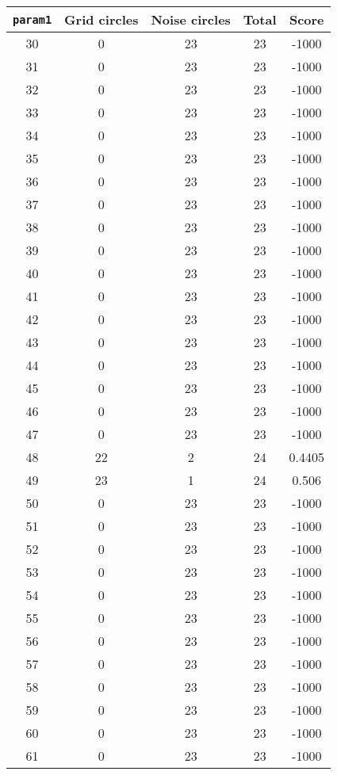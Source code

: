 \documentclass[letterpaper, 12pt]{article}
\begin{document}
\begin{longtable}{|c|c|c|c|c|}
\hline
\textbf{\texttt{param1}} & \textbf{Grid circles} & \textbf{Noise circles} & \textbf{Total} & \textbf{Score} \\
\hline
30 & 0 & 23 & 23 & -1000 \\
\hline
31 & 0 & 23 & 23 & -1000 \\
\hline
32 & 0 & 23 & 23 & -1000 \\
\hline
33 & 0 & 23 & 23 & -1000 \\
\hline
34 & 0 & 23 & 23 & -1000 \\
\hline
35 & 0 & 23 & 23 & -1000 \\
\hline
36 & 0 & 23 & 23 & -1000 \\
\hline
37 & 0 & 23 & 23 & -1000 \\
\hline
38 & 0 & 23 & 23 & -1000 \\
\hline
39 & 0 & 23 & 23 & -1000 \\
\hline
40 & 0 & 23 & 23 & -1000 \\
\hline
41 & 0 & 23 & 23 & -1000 \\
\hline
42 & 0 & 23 & 23 & -1000 \\
\hline
43 & 0 & 23 & 23 & -1000 \\
\hline
44 & 0 & 23 & 23 & -1000 \\
\hline
45 & 0 & 23 & 23 & -1000 \\
\hline
46 & 0 & 23 & 23 & -1000 \\
\hline
47 & 0 & 23 & 23 & -1000 \\
\hline
48 & 22 & 2 & 24 & 0.4405 \\
\hline
49 & 23 & 1 & 24 & 0.506 \\
\hline
50 & 0 & 23 & 23 & -1000 \\
\hline
51 & 0 & 23 & 23 & -1000 \\
\hline
52 & 0 & 23 & 23 & -1000 \\
\hline
53 & 0 & 23 & 23 & -1000 \\
\hline
54 & 0 & 23 & 23 & -1000 \\
\hline
55 & 0 & 23 & 23 & -1000 \\
\hline
56 & 0 & 23 & 23 & -1000 \\
\hline
57 & 0 & 23 & 23 & -1000 \\
\hline
58 & 0 & 23 & 23 & -1000 \\
\hline
59 & 0 & 23 & 23 & -1000 \\
\hline
60 & 0 & 23 & 23 & -1000 \\
\hline
61 & 0 & 23 & 23 & -1000 \\

\end{longtable}
\end{document}
